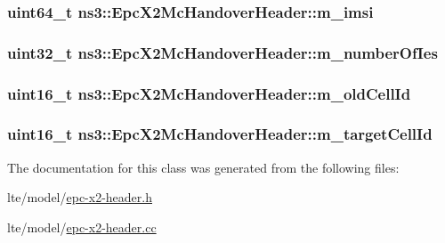 \subsubsection[{\texorpdfstring{m\+\_\+imsi}{m_imsi}}]{\setlength{\rightskip}{0pt plus 5cm}uint64\+\_\+t ns3\+::\+Epc\+X2\+Mc\+Handover\+Header\+::m\+\_\+imsi\hspace{0.3cm}{\ttfamily [private]}}\hypertarget{classns3_1_1EpcX2McHandoverHeader_adb8790750bd8f2c37b6ffee53e0b0c92}{}\label{classns3_1_1EpcX2McHandoverHeader_adb8790750bd8f2c37b6ffee53e0b0c92}
\subsubsection[{\texorpdfstring{m\+\_\+number\+Of\+Ies}{m_numberOfIes}}]{\setlength{\rightskip}{0pt plus 5cm}uint32\+\_\+t ns3\+::\+Epc\+X2\+Mc\+Handover\+Header\+::m\+\_\+number\+Of\+Ies\hspace{0.3cm}{\ttfamily [private]}}\hypertarget{classns3_1_1EpcX2McHandoverHeader_aa711729259527417a178c6d658ba58df}{}\label{classns3_1_1EpcX2McHandoverHeader_aa711729259527417a178c6d658ba58df}
\subsubsection[{\texorpdfstring{m\+\_\+old\+Cell\+Id}{m_oldCellId}}]{\setlength{\rightskip}{0pt plus 5cm}uint16\+\_\+t ns3\+::\+Epc\+X2\+Mc\+Handover\+Header\+::m\+\_\+old\+Cell\+Id\hspace{0.3cm}{\ttfamily [private]}}\hypertarget{classns3_1_1EpcX2McHandoverHeader_a246466a53b913f850386323f8ae9109d}{}\label{classns3_1_1EpcX2McHandoverHeader_a246466a53b913f850386323f8ae9109d}
\subsubsection[{\texorpdfstring{m\+\_\+target\+Cell\+Id}{m_targetCellId}}]{\setlength{\rightskip}{0pt plus 5cm}uint16\+\_\+t ns3\+::\+Epc\+X2\+Mc\+Handover\+Header\+::m\+\_\+target\+Cell\+Id\hspace{0.3cm}{\ttfamily [private]}}\hypertarget{classns3_1_1EpcX2McHandoverHeader_afcaab56e271235db153082233b3dd23d}{}\label{classns3_1_1EpcX2McHandoverHeader_afcaab56e271235db153082233b3dd23d}


The documentation for this class was generated from the following files\+:\begin{DoxyCompactItemize}
\item 
lte/model/\hyperlink{epc-x2-header_8h}{epc-\/x2-\/header.\+h}\item 
lte/model/\hyperlink{epc-x2-header_8cc}{epc-\/x2-\/header.\+cc}\end{DoxyCompactItemize}
